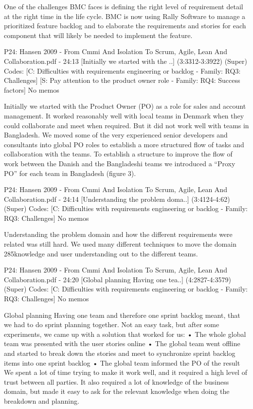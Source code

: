 \documentclass[preprint,authoryear,12pt]{elsarticle}
\begin{document}
One of the challenges BMC faces is defining the right
level of requirement detail at the right time in the life
cycle. BMC is now using Rally Software to manage a
prioritized feature backlog and to elaborate the
requirements and stories for each component that will
likely be needed to implement the feature.


P24: Hansen 2009 - From Cmmi And Isolation To Scrum, Agile, Lean And Collaboration.pdf - 24:13 [Initially we started with the ..]  (3:3312-3:3922)   (Super)
Codes:	[C: Difficulties with requirements engineering or backlog - Family: RQ3: Challenges] [S: Pay attention to the product owner role - Family: RQ4: Success factors] 
No memos

Initially we started with the Product Owner (PO) 
as a role for sales and account management. It worked 
reasonably well with local teams in Denmark when 
they could collaborate and meet when required. But it 
did not work well with teams in Bangladesh. We 
moved some of the very experienced senior developers 
and consultants into global PO roles to establish a more 
structured flow of tasks and collaboration with the 
teams.  
To establish a structure to improve the flow of 
work between the Danish and the Bangladeshi teams 
we introduced a “Proxy PO” for each team in 
Bangladesh (figure 3).


P24: Hansen 2009 - From Cmmi And Isolation To Scrum, Agile, Lean And Collaboration.pdf - 24:14 [Understanding the problem doma..]  (3:4124-4:62)   (Super)
Codes:	[C: Difficulties with requirements engineering or backlog - Family: RQ3: Challenges] 
No memos

Understanding the problem domain and how the 
different requirements were related was still hard. We 
used many different techniques to move the domain 
285knowledge and user understanding out to the different 
teams.


P24: Hansen 2009 - From Cmmi And Isolation To Scrum, Agile, Lean And Collaboration.pdf - 24:20 [Global planning Having one tea..]  (4:2827-4:3579)   (Super)
Codes:	[C: Difficulties with requirements engineering or backlog - Family: RQ3: Challenges] 
No memos

Global planning 
Having one team and therefore one sprint backlog 
meant, that we had to do sprint planning together. Not 
an easy task, but after some experiments, we came up 
with a solution that worked for us: 
• The whole global team was presented with the user 
stories online 
• The global team went offline and started to break 
down the stories and meet to synchronize sprint 
backlog items into one sprint backlog 
• The global team informed the PO of the result 
We spent a lot of time trying to make it work well, 
and it required a high level of trust between all parties.  
It also required a lot of knowledge of the business 
domain, but made it easy to ask for the relevant 
knowledge when doing the breakdown and planning.
\end{document}
